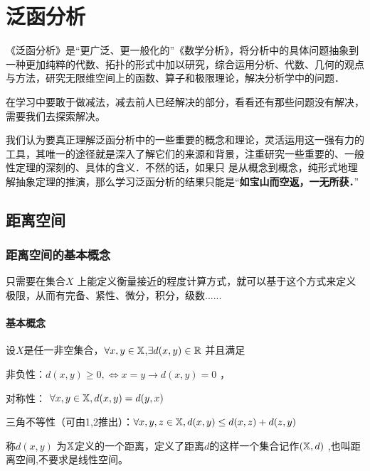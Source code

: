 \chapter{\maoti 泛函分析}
\vspace{20.4pt}

《泛函分析》是“更广泛、更一般化的”《数学分析》，将分析中的具体问题抽象到一种更加纯粹的代数、拓扑的形式中加以研究，综合运用分析、代数、几何的观点与方法，研究无限维空间上的函数、算子和极限理论，解决分析学中的问题．
\begin{center}
	\textcolor[RGB]{255, 0, 0}{\faHeart}在学习中要敢于做减法，减去前人已经解决的部分，看看还有那些问题没有解决，需要我们去探索解决。\textcolor[RGB]{255, 0, 0}{\faHeart}
\end{center}
\vspace{-5pt}
\begin{center}
\end{center}
 
 我们认为要真正理解泛函分析中的一些重要的概念和理论，灵活运用这一强有力的工具，其唯一的途径就是深入了解它们的来源和背景，注重研究一些重要的、一般性定理的深刻的、具体的含义．不然的话，如果只
是从概念到概念，纯形式地理解抽象定理的推演，那么学习泛函分析的结果只能是“\textbf{如宝山而空返，一无所获．}”


\section{\deng 距离空间}

 \subsection{\zhen 距离空间的基本概念}
 
 \faSendO  只需要在集合$X$ \X 上能定义衡量接近的程度计算方式，就可以基于这个方式来定义极限，从而有完备、紧性、微分，积分，级数...... 
 	\subsubsection{基本概念}
 	\begin{definition}[距离空间] \label{def:001}
 		设$X$是任一非空集合，$\forall x,y \in \mathbb{X} $,$\exists d(x,y) \in \mathbb{R} $ 并且满足
 	\begin{kuohaotwo}
 		\item 非负性：$d(x,y) \ge 0, \Leftrightarrow x = y \to d(x,y)=0$ ，
 		\item 对称性： $\forall x,y \in \mathbb{X}, d(x,y) = d(y,x) $
 		\item 三角不等性（可由1,2推出）：$\forall x,y,z \in \mathbb{X}, d(x,y) \le d(x,z) + d(z,y)$
 	\end{kuohaotwo}
称$d(x,y)$ 为$\mathbb{X}$定义的一个距离，定义了距离$d$的这样一个集合记作$(\mathbb{X},d)$ ,也叫距离空间,不要求是线性空间。
 	\end{definition} 

